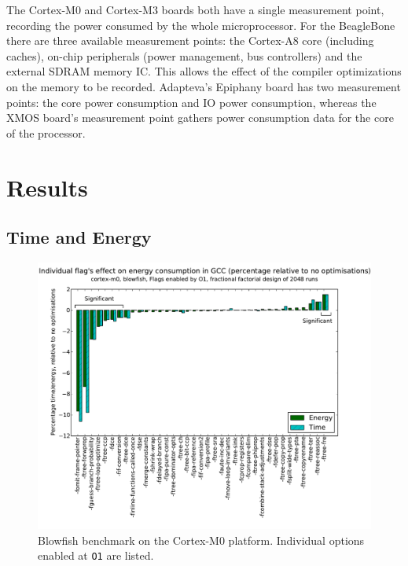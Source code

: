 \documentclass[twocolumn]{article}
\let\oldcaption\caption
\renewcommand{\caption}[1]{\oldcaption{\textup{#1}}}
\begin{document}
The Cortex-M0 and Cortex-M3 boards both have a single measurement point, recording the power consumed by the whole microprocessor. For the BeagleBone there are three available measurement points: the Cortex-A8 core (including caches), on-chip peripherals (power management, bus controllers) and the external SDRAM memory IC. This allows the effect of the compiler optimizations on the memory to be recorded. Adapteva's Epiphany board has two measurement points: the core power consumption and IO power consumption, whereas the XMOS board's measurement point gathers power consumption data for the core of the processor.

\section{Results}

\subsection*{Time and Energy}

\begin{figure}[t!]
	\includegraphics[width=\linewidth,clip,trim=0.5cm 0 2cm 1.8cm]{cortex-m0/O1_main_effects_blowfish.pdf}
	\caption{Blowfish benchmark on the Cortex-M0 platform. Individual options enabled at \texttt{O1} are listed.}
	\label{Fig:BlowfishMainEffects}
\end{figure}
\end{document}
